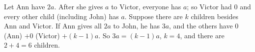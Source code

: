 Let Ann have $2a$. After she gives $a$ to Victor, everyone has $a$; so Victor had $0$ and every other child (including John) has $a$. Suppose there are $k$ children besides Ann and Victor. If Ann gives all $2a$ to John, he has $3a$, and the others have $0$ (Ann) $+0$ (Victor) $+(k-1)a$. So $3a=(k-1)a$, $k=4$, and there are $2+4=\boxed{6}$ children.
